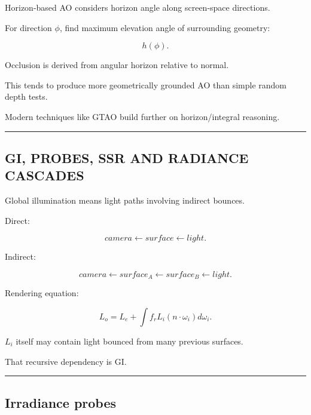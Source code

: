 \hypertarget{04-visual-computing-ii-ch040-hbao}{}

Horizon-based AO considers horizon angle along screen-space directions.

For direction \(\phi\), find maximum elevation angle of surrounding geometry:

\[
h(\phi).
\]

Occlusion is derived from angular horizon relative to normal.

This tends to produce more geometrically grounded AO than simple random depth tests.

Modern techniques like GTAO build further on horizon/integral reasoning.

\begin{center}\rule{0.5\linewidth}{0.5pt}\end{center}

\subsection{GI, PROBES, SSR AND RADIANCE CASCADES}\label{04-visual-computing-ii-ch040-gi-probes-ssr-and-radiance-cascades}

\hypertarget{04-visual-computing-ii-ch040-gi-probes-ssr-and-radiance-cascades}{}

Global illumination means light paths involving indirect bounces.

Direct:

\[
camera
\leftarrow
surface
\leftarrow
light.
\]

Indirect:

\[
camera
\leftarrow
surface_A
\leftarrow
surface_B
\leftarrow
light.
\]

Rendering equation:

\[
L_o=
L_e+
\int
f_rL_i(n\cdot\omega_i)d\omega_i.
\]

\(L_i\) itself may contain light bounced from many previous surfaces.

That recursive dependency is GI.

\begin{center}\rule{0.5\linewidth}{0.5pt}\end{center}

\subsection{Irradiance probes}\label{04-visual-computing-ii-ch040-irradiance-probes}

\hypertarget{04-visual-computing-ii-ch040-irradiance-probes}{}

